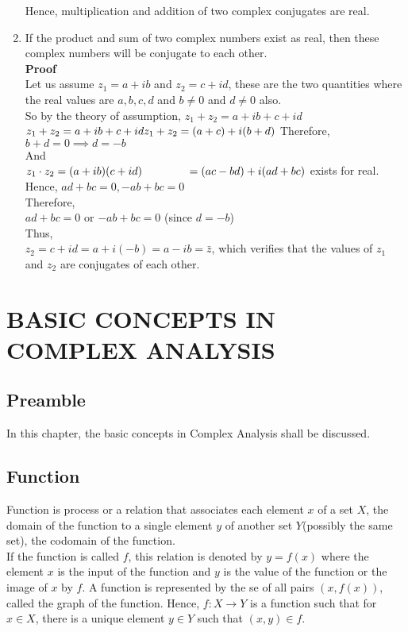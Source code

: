 \documentclass[11pt]{report}
\newcommand{\sps}{\\[0.2cm]}
\newcommand{\bt}[1]{\textbf{#1}}
\newcommand{\NI}{\noindent}
\begin{document}
\begin{enumerate}
		Hence, multiplication and addition of two complex conjugates are real.\\
		\item If the product and sum of two complex numbers exist as real, then these complex numbers will be conjugate to each other.\sps
		\bt{Proof}\sps
		Let us assume $z_1 = a+ib$ and $z_2 = c+id$, these are the two quantities where the real values are $a,b,c,d$ and $b\neq 0$ and $d\neq 0$ also.\sps
		So by the theory of assumption, $z_1 + z_2 = a+ib + c+id$\\
		$
			z_1+z_2 = a+ib + c +id\sps
			z_1+z_2 = (a+c) + i(b+d)\sps
		$
		Therefore, $b+d=0 \implies d = -b$\sps
		And\sps
		$
			z_1 \cdot z_2 = (a+ib)(c+id)\\
			~~~~~~~~~~~~ = (ac - bd) + i(ad+bc)$ exists for real.\\
		Hence, $ad+bc=0, -ab+bc=0$\\
		Therefore,\\
		$ad+bc=0$ or $-ab + bc =0$ (since $d=-b$)\\
		Thus,\\
		$z_2 = c+id=a+i(-b)=a-ib=\bar{z}$, which verifies that the values of $z_1$ and $z_2$ are conjugates of each other.
	\end{enumerate}

	\newpage
	
	\chapter{BASIC CONCEPTS IN COMPLEX ANALYSIS}
	\section{Preamble}
	In this chapter, the basic concepts in Complex Analysis shall be discussed.
	
	\section{Function}
	Function is process or a relation that associates each element $x$ of a set $X$, the domain of the function to a single element $y$ of another set $Y$(possibly the same set), the codomain of the function.\\
	
	\NI If the function is called $f$, this relation is denoted by $y=f(x)$ where the element $x$ is the input of the function and $y$ is the value of the function or the image of $x$ by $f$. A function is represented by the se of all pairs $(x,f(x))$, called the graph of the function. Hence, $f:X\rightarrow Y$ is a function such that for $x\in X$, there is a unique element $y\in Y$ such that $(x,y)\in f$.
\end{document}
